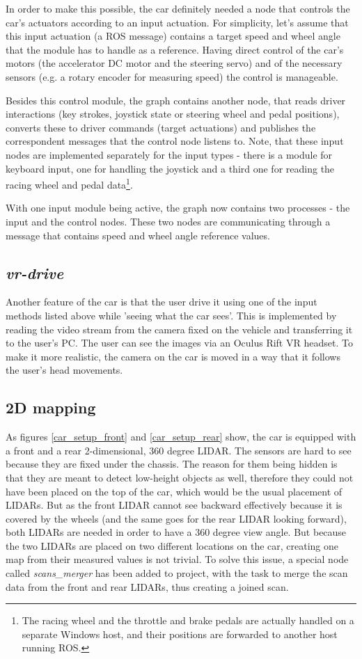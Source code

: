 In order to make this possible, the car definitely needed a node that controls the car's actuators according to an input actuation. For simplicity, let's assume that this input actuation (a ROS message) contains a target speed and wheel angle that the module has to handle as a reference. Having direct control of the car's motors (the accelerator DC motor and the steering servo) and of the necessary sensors (e.g. a rotary encoder for measuring speed) the control is manageable.

Besides this control module, the graph contains another node, that reads driver interactions (key strokes, joystick state or steering wheel and pedal positions), converts these to driver commands (target actuations) and publishes the correspondent messages that the control node listens to. Note, that these input nodes are implemented separately for the input types - there is a module for keyboard input, one for handling the joystick and a third one for reading the racing wheel and pedal data\footnote{The racing wheel and the throttle and brake pedals are actually handled on a separate Windows host, and their positions are forwarded to another host running ROS.}.

With one input module being active, the graph now contains two processes - the input and the control nodes. These two nodes are communicating through a message that contains speed and wheel angle reference values.

\subsection{\textit{vr-drive}}
Another feature of the car is that the user drive it using one of the input methods listed above while 'seeing what the car sees'. This is implemented by reading the video stream from the camera fixed on the vehicle and transferring it to the user's PC. The user can see the images via an Oculus Rift VR headset. To make it more realistic, the camera on the car is moved in a way that it follows the user's head movements.

\subsection{2D mapping}
As figures \ref{car_setup_front} and \ref{car_setup_rear} show, the car is equipped with a front and a rear 2-dimensional, 360 degree LIDAR. The sensors are hard to see because they are fixed under the chassis. The reason for them being hidden is that they are meant to detect low-height objects as well, therefore they could not have been placed on the top of the car, which would be the usual placement of LIDARs. But as the front LIDAR cannot see backward effectively because it is covered by the wheels (and the same goes for the rear LIDAR looking forward), both LIDARs are needed in order to have a 360 degree view angle. But because the two LIDARs are placed on two different locations on the car, creating one map from their measured values is not trivial. To solve this issue, a special node called \textit{scans\_merger} has been added to project, with the task to merge the scan data from the front and rear LIDARs, thus creating a joined scan.


